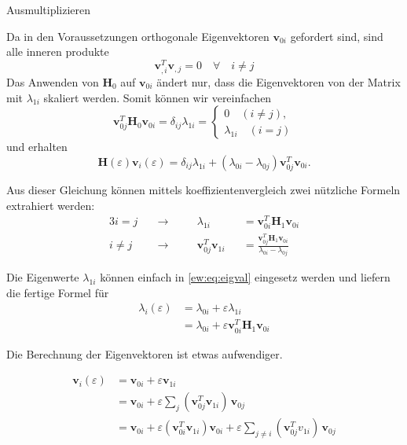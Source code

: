 Ausmultiplizieren

Da in den Voraussetzungen orthogonale Eigenvektoren $\bm v_{0i}$ gefordert sind, sind alle inneren produkte
\begin{equation}
    \bm v_{,i}^T \bm v_{,j} = 0 \quad \forall \quad i \neq j
\end{equation}
Das Anwenden von $\bm H_0$ auf $\bm v_{0i}$ ändert nur, dass die Eigenvektoren von der Matrix mit $\lambda_{1i}$ skaliert werden.
Somit können wir vereinfachen
\begin{equation*}
    \bm v_{0j}^T \bm H_0 \bm v_{0i}
    = \delta_{ij} \lambda_{1i}
    = \begin{cases}
        0 \quad (i \neq j),\\
        \lambda_{1i} \quad (i = j)
        \end{cases}
\end{equation*}
und erhalten
\begin{equation}
    \bm H(\varepsilon) \bm v_i(\varepsilon)
    =
    \delta_{ij} \lambda_{1i} + 
    ( \lambda_{0i} - \lambda_{0j} )
    \bm v_{0j}^T  \bm v_{0i} .
\end{equation}


Aus dieser Gleichung können mittels koeffizientenvergleich zwei nützliche Formeln extrahiert werden:
\begin{alignat*}{3}
    i = j \quad & \rightarrow  \quad && \lambda_{1i}&& = \bm v_{0i}^T \bm H_1 \bm v_{0i} \\
    i \neq j \quad & \rightarrow \quad && \bm v_{0j}^T \bm v_{1i}&& = \frac{\bm v_{0j}^T \bm H_1 \bm v_{0i}}{\lambda_{0i} - \lambda_{0j}}
\end{alignat*}

Die Eigenwerte $\lambda_{1i}$ können einfach in \ref{ew:eq:eigval} eingesetz werden und liefern die fertige Formel für   
\begin{align*}
    \lambda_i(\varepsilon)
    &=
    \lambda_{0i} + \varepsilon \lambda_{1i} \\
    &=
    \lambda_{0i} + \varepsilon \bm v_{0i}^T \bm H_1 \bm v_{0i}
\end{align*}

Die Berechnung der Eigenvektoren ist etwas aufwendiger.


\begin{align*}
    \bm v_i(\varepsilon)
    &=
    \bm v_{0i} + \varepsilon \bm v_{1i} \\
    &=
    \bm v_{0i} + \varepsilon \sum_{j} ( \bm v_{0j}^T \bm v_{1i}) \, \bm v_{0j} \\
    &=
    \bm v_{0i} + \varepsilon ( \bm v_{0i}^T \bm v_{1i}) \bm v_{0i} + \varepsilon \sum_{j \neq i} (\bm v_{0j}^T v_{1i}) \, \bm v_{0j}
\end{align*}

